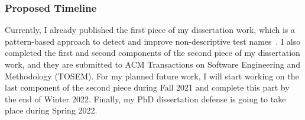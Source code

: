 \subsubsection{Proposed Timeline}

Currently, I already published the first piece of my dissertation work, which is a pattern-based approach to detect and improve non-descriptive test names~\cite{wu2020pattern}.
%
I also completed the first and second components of the second piece of my dissertation work, and they are submitted to ACM Transactions on Software Engineering and Methodology (TOSEM).
%
For my planned future work, I will start working on the last component of the second piece during Fall 2021 and complete this part by the end of Winter 2022.
%
Finally, my PhD dissertation defense is going to take place during Spring 2022.